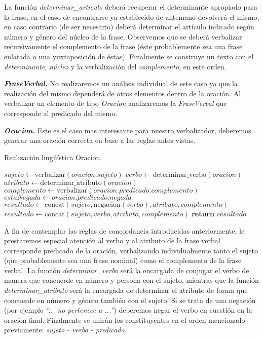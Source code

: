 \noindent
La función \emph{determinar\_articulo} deberá recuperar el determinante apropiado para la frase, en el caso de encontrarse ya establecido de antemano devolverá el mismo, en caso contrario (de ser necesario) deberá determinar el artículo indicado según número y género del núcleo de la frase. Observemos que se deberá verbalizar recursivamente el complemento de la frase (éste probablemente sea una frase enlatada o una yuxtaposición de éstas). Finalmente se construye un texto con el \emph{determinante}, \emph{núcleo} y la verbalización del \emph{complemento}, en este orden.

\medskip
\noindent
\textbf{\emph{FraseVerbal.}} No realizaremos un análisis individual de este caso ya que la realización del mismo dependerá de otros elementos dentro de la oración. Al verbalizar un elemento de tipo \emph{Oracion} analizaremos la \emph{FraseVerbal} que corresponde al predicado del mismo.


\medskip
\noindent
\textbf{\emph{Oracion.}} Este es el caso mas interesante para nuestro verbalizador, deberemos generar una oración correcta en base a las reglas antes vistas. 

\begin{algorithm}[H]
\caption{Realización lingüística Oracion.}
\begin{algorithmic}[1]
\State $sujeto\gets \text{verbalizar}(oracion.sujeto)$
\State $verbo\gets \text{determinar\_verbo}(oracion)$
\State $atributo\gets \text{determinar\_atributo}(oracion)$
\State $complemento\gets \text{verbalizar}(oracion.predicado.complemento)$
\State $estaNegada\gets oracion.predicado.negada$
\Statex
{}
\State $resultado\gets \text{concat}(sujeto, \text{negacion}(verbo), atributo, complemento)$
\Else
\State $resultado\gets \text{concat}(sujeto, verbo, atributo, complemento)$
\EndIf
\Statex
\State \textbf{return} $resultado$
\EndFunction
\end{algorithmic}
\end{algorithm}

\noindent
A fin de contemplar las reglas de concordancia introducidas anteriormente, le prestaremos especial atención al verbo y al atributo de la frase verbal corresponde predicado de la oración, verbalizando individualmente tanto el sujeto (que probablemente sea una frase nominal) como el complemento de la frase verbal. La función \emph{determinar\_verbo} será la encargada de conjugar el verbo de manera que concuerde en número y persona con el sujeto, mientras que la función \emph{determinar\_atributo} será la encargada de determinar el atributo de forma que concuerde en número y género también con el sujeto. Si se trata de una negación (por ejemplo \emph{``... no pertenece a ...''}) deberemos negar el verbo en cuestión en la oración final. Finalmente se unirán los constituyentes en el orden mencionado previamente: \emph{sujeto - verbo - predicado}.
